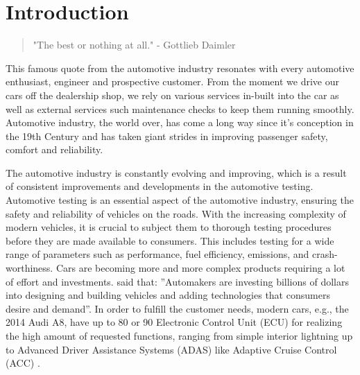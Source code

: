 \section{Introduction}


\begin{quote}
    \large "The best or nothing at all." - Gottlieb Daimler
\end{quote}

This famous quote from the automotive industry resonates with every automotive enthusiast, engineer and prospective customer. From the moment we drive our cars off the dealership shop, we rely on various services in-built into the car as well as external services such maintenance checks to keep them running smoothly. Automotive industry, the world over, has come a long way since it's conception in the 19th Century and has taken giant strides in improving passenger safety, comfort and reliability. 

The automotive industry is constantly evolving and improving, which is a result of consistent improvements and developments in the automotive testing. Automotive testing is an essential aspect of the automotive industry, ensuring the safety and reliability of vehicles on the roads. With the increasing complexity of modern vehicles, it is crucial to subject them to thorough testing procedures before they are made available to consumers. This includes testing for a wide range of parameters such as performance, fuel efficiency, emissions, and crash-worthiness. Cars are becoming more and more complex products requiring a lot of effort and investments. \cite{jpower} said that: ”Automakers are investing billions of dollars into designing and building vehicles and adding technologies that consumers desire and demand”.
In order to fulfill the customer needs, modern cars, e.g., the 2014 Audi A8, have up to 80 or 90 Electronic Control Unit (ECU) for realizing the high amount of requested functions, ranging from simple interior lightning up to Advanced Driver Assistance Systems (ADAS) like Adaptive Cruise Control (ACC) \cite{Audi}.

